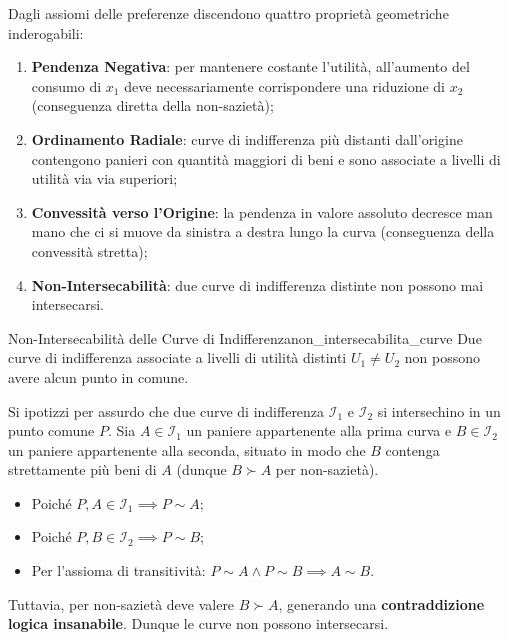 Dagli assiomi delle preferenze discendono quattro proprietà geometriche inderogabili:
\begin{enumerate}
    \item \textbf{Pendenza Negativa}: per mantenere costante l'utilità, all'aumento del consumo di $x_1$ deve necessariamente corrispondere una riduzione di $x_2$ (conseguenza diretta della non-sazietà);
    \item \textbf{Ordinamento Radiale}: curve di indifferenza più distanti dall'origine contengono panieri con quantità maggiori di beni e sono associate a livelli di utilità via via superiori;
    \item \textbf{Convessità verso l'Origine}: la pendenza in valore assoluto decresce man mano che ci si muove da sinistra a destra lungo la curva (conseguenza della convessità stretta);
    \item \textbf{Non-Intersecabilità}: due curve di indifferenza distinte non possono mai intersecarsi.
\end{enumerate}

\begin{teorema}{Non-Intersecabilità delle Curve di Indifferenza}{non_intersecabilita_curve}
Due curve di indifferenza associate a livelli di utilità distinti $U_1 \neq U_2$ non possono avere alcun punto in comune.
\end{teorema}

\begin{dimostrazione}
Si ipotizzi per assurdo che due curve di indifferenza $\mathcal{I}_1$ e $\mathcal{I}_2$ si intersechino in un punto comune $P$.
Sia $A \in \mathcal{I}_1$ un paniere appartenente alla prima curva e $B \in \mathcal{I}_2$ un paniere appartenente alla seconda, situato in modo che $B$ contenga strettamente più beni di $A$ (dunque $B \succ A$ per non-sazietà).
\begin{itemize}
    \item Poiché $P, A \in \mathcal{I}_1 \implies P \sim A$;
    \item Poiché $P, B \in \mathcal{I}_2 \implies P \sim B$;
    \item Per l'assioma di transitività: $P \sim A \land P \sim B \implies A \sim B$.
\end{itemize}
Tuttavia, per non-sazietà deve valere $B \succ A$, generando una \textbf{contraddizione logica insanabile}. Dunque le curve non possono intersecarsi.
\end{dimostrazione}

